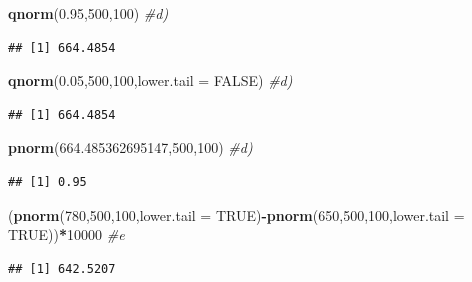 \documentclass[
]{article}
\newenvironment{Shaded}{\begin{snugshade}}{\end{snugshade}}
\newcommand{\AttributeTok}[1]{\textcolor[rgb]{0.13,0.29,0.53}{#1}}
\newcommand{\CommentTok}[1]{\textcolor[rgb]{0.56,0.35,0.01}{\textit{#1}}}
\newcommand{\ConstantTok}[1]{\textcolor[rgb]{0.56,0.35,0.01}{#1}}
\newcommand{\DecValTok}[1]{\textcolor[rgb]{0.00,0.00,0.81}{#1}}
\newcommand{\FloatTok}[1]{\textcolor[rgb]{0.00,0.00,0.81}{#1}}
\newcommand{\FunctionTok}[1]{\textcolor[rgb]{0.13,0.29,0.53}{\textbf{#1}}}
\newcommand{\NormalTok}[1]{#1}
\newcommand{\SpecialCharTok}[1]{\textcolor[rgb]{0.81,0.36,0.00}{\textbf{#1}}}
\begin{document}
\begin{Shaded}
\begin{Highlighting}[]
\FunctionTok{qnorm}\NormalTok{(}\FloatTok{0.95}\NormalTok{,}\DecValTok{500}\NormalTok{,}\DecValTok{100}\NormalTok{) }\CommentTok{\#d)}
\end{Highlighting}
\end{Shaded}

\begin{verbatim}
## [1] 664.4854
\end{verbatim}

\begin{Shaded}
\begin{Highlighting}[]
\FunctionTok{qnorm}\NormalTok{(}\FloatTok{0.05}\NormalTok{,}\DecValTok{500}\NormalTok{,}\DecValTok{100}\NormalTok{,}\AttributeTok{lower.tail =} \ConstantTok{FALSE}\NormalTok{) }\CommentTok{\#d)}
\end{Highlighting}
\end{Shaded}

\begin{verbatim}
## [1] 664.4854
\end{verbatim}

\begin{Shaded}
\begin{Highlighting}[]
\FunctionTok{pnorm}\NormalTok{(}\FloatTok{664.485362695147}\NormalTok{,}\DecValTok{500}\NormalTok{,}\DecValTok{100}\NormalTok{) }\CommentTok{\#d)}
\end{Highlighting}
\end{Shaded}

\begin{verbatim}
## [1] 0.95
\end{verbatim}

\begin{Shaded}
\begin{Highlighting}[]
\NormalTok{(}\FunctionTok{pnorm}\NormalTok{(}\DecValTok{780}\NormalTok{,}\DecValTok{500}\NormalTok{,}\DecValTok{100}\NormalTok{,}\AttributeTok{lower.tail =} \ConstantTok{TRUE}\NormalTok{)}\SpecialCharTok{{-}}\FunctionTok{pnorm}\NormalTok{(}\DecValTok{650}\NormalTok{,}\DecValTok{500}\NormalTok{,}\DecValTok{100}\NormalTok{,}\AttributeTok{lower.tail =} \ConstantTok{TRUE}\NormalTok{))}\SpecialCharTok{*}\DecValTok{10000} \CommentTok{\#e}
\end{Highlighting}
\end{Shaded}

\begin{verbatim}
## [1] 642.5207
\end{verbatim}
\end{document}
